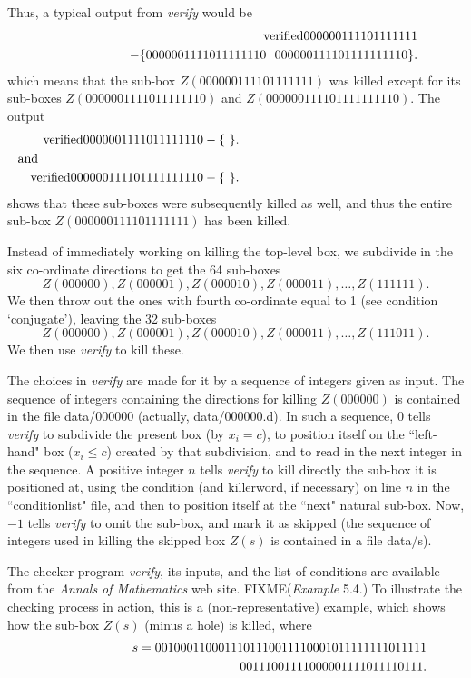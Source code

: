 Thus, a typical output from {\it verify} would be 
\begin{eqnarray*}
&&{\rm verified} 000000111101111111 \\
&&\qquad\qquad\quad- 
\{ 0000001111011111110 \ \ 000000111101111111110 \} .
\end{eqnarray*}
which means that the sub-box $Z(000000111101111111)$ was killed except for its sub-boxes
$Z(0000001111011111110)$  and $Z(000000111101111111110).$  The output 
\begin{eqnarray*}
&&{\rm verified} 0000001111011111110 - \{\ \}.\\
\noalign{\noindent and}
&&{\rm verified} 000000111101111111110 - \{\ \}.
\end{eqnarray*} shows that these sub-boxes were subsequently killed as well, and thus the entire sub-box
$Z(000000111101111111)$ has been killed. 


Instead of immediately working on killing the top-level box, we subdivide in the six co-ordinate directions to get the 64 sub-boxes $$Z(000000),Z(000001),Z(000010),Z(000011),\ldots, Z(111111).$$ 
\noindent We then throw out
the ones with fourth co-ordinate equal to 1 (see condition `conjugate'), leaving  the 32 sub-boxes
$$Z(000000),Z(000001),Z(000010),Z(000011),\ldots, Z(111011).$$  \noindent We then use {\it verify} to kill these.
\eject

The choices in {\it verify} are made for it by a sequence
of integers given as input.  The sequence of integers containing the directions for killing $Z(000000)$ is contained in the file data/000000 (actually, data/000000.d).
In such a sequence, 
$0$ tells {\it verify} to subdivide the present box (by $x_i = c$),  to position itself on the ``left-hand" box ($x_i \le c$)
created by that subdivision, and to read in the next integer in the sequence. A  positive integer $n$ tells {\it verify} to
kill directly the sub-box it is positioned at, using the condition (and killerword, if necessary) on line $n$ in the
``conditionlist" file,  and then to position itself at the ``next" natural sub-box.  Now,
$-1$ tells {\it verify} to omit the sub-box, and mark it as skipped
(the sequence of integers used in killing the skipped box $Z(s)$ is contained in a file data/s).


The checker program {\it verify}, its inputs, and the list of conditions
are available from the {\it Annals of Mathematics} web site.
FIXME({\it Example} 5.4.)
To illustrate the checking process in action, this is a (non-representative)
example, which shows how the sub-box $Z(s)$ (minus a hole) is killed,
where
\begin{eqnarray*}
&&s=0010001100011101110011110001011111111011111\\
&&\hskip2in 00111001111000001111011110111. 
\end{eqnarray*}


